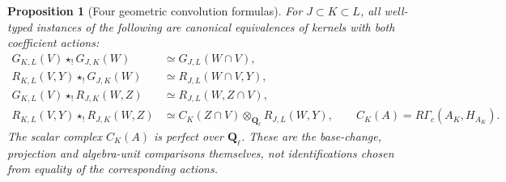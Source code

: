 \documentclass[11pt]{article}
\newtheorem{proposition}{Proposition}[section]
\theoremstyle{definition}
\theoremstyle{remark}
\newcommand{\Q}{\mathbf Q_\ell}
\begin{document}
\begin{proposition}[Four geometric convolution formulas]
\label{prop:four-convolutions}
For $J\subset K\subset L$, all well-typed instances of the following
are canonical equivalences of kernels with both coefficient actions:
\begin{align*}
 G_{K,L}(V)\star_!G_{J,K}(W)
    &\simeq G_{J,L}(W\cap V),\\
 R_{K,L}(V,Y)\star_!G_{J,K}(W)
    &\simeq R_{J,L}(W\cap V,Y),\\
 G_{K,L}(V)\star_!R_{J,K}(W,Z)
    &\simeq R_{J,L}(W,Z\cap V),\\
 R_{K,L}(V,Y)\star_!R_{J,K}(W,Z)
    &\simeq C_K(Z\cap V)\otimes_{\Q}R_{J,L}(W,Y),
 \qquad C_K(A)=R\Gamma_c(A_K,H_{A_K}).
\end{align*}
The scalar complex $C_K(A)$ is perfect over $\Q$.  These are the
base-change, projection and algebra-unit comparisons themselves,
not identifications chosen from equality of the corresponding actions.
\end{proposition}
\end{document}
